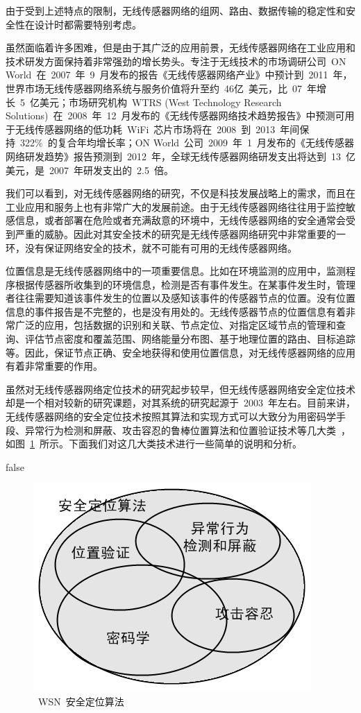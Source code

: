 \documentclass[a4paper,10pt]{article}
\begin{document}
由于受到上述特点的限制，无线传感器网络的组网、路由、数据传输的稳定性和安全性在设计时都需要特别考虑。

虽然面临着许多困难，但是由于其广泛的应用前景，无线传感器网络在工业应用和技术研发方面保持着非常强劲的增长势头。专注于无线技术的市场调研公司~ON World~在~2007~年~9~月发布的报告《无线传感器网络产业》中预计到~2011~年，世界市场无线传感器网络系统与服务价值将升至约~46亿~美元，比~07~年增长~5~亿美元；市场研究机构~WTRS (West Technology
Research Solutions)~在~2008~年~12~月发布的《无线传感器网络技术趋势报告》中预测可用于无线传感器网络的低功耗~WiFi~芯片市场将在~2008~到~2013~年间保持~322\%~的复合年均增长率；ON World~公司~2009~年~1~月发布的《无线传感器网络研发趋势》报告预测到~2012~年，全球无线传感器网络研发支出将达到~13~亿美元，是~2007~年研发支出的~2.5~倍。

我们可以看到，对无线传感器网络的研究，不仅是科技发展战略上的需求，而且在工业应用和服务上也有非常广大的发展前途。由于无线传感器网络往往用于监控敏感信息，或者部署在危险或者充满敌意的环境中，无线传感器网络的安全通常会受到严重的威胁。因此对其安全技术的研究是无线传感器网络研究中非常重要的一环，没有保证网络安全的技术，就不可能有可用的无线传感器网络。

位置信息是无线传感器网络中的一项重要信息。比如在环境监测的应用中，监测程序根据传感器所收集到的环境信息，检测是否有事件发生。在某事件发生时，管理者往往需要知道该事件发生的位置以及感知该事件的传感器节点的位置。没有位置信息的事件报告是不完整的，也是没有用处的。无线传感器节点的位置信息有着非常广泛的应用，包括数据的识别和关联、节点定位、对指定区域节点的管理和查询、评估节点密度和覆盖范围、网络能量分布图、基于地理位置的路由、目标追踪等。因此，保证节点正确、安全地获得和使用位置信息，对无线传感器网络的应用有着非常重要的作用。

虽然对无线传感器网络定位技术的研究起步较早，但无线传感器网络安全定位技术却是一个相对较新的研究课题，对其系统的研究起源于~2003~年左右。目前来讲，无线传感器网络的安全定位技术按照其算法和实现方式可以大致分为用密码学手段、异常行为检测和屏蔽、攻击容忍的鲁棒位置算法和位置验证技术等几大类~\cite{Boukerche2008}，如图~\ref{wsn_sec_pos}~所示。下面我们对这几大类技术进行一些简单的说明和分析。

\if false
\begin{figure}[htbp]
  \centering
  \includegraphics[width=.9\textwidth,keepaspectratio]{wsn_sec_pos}
  \caption{\label{wsn_sec_pos}~WSN~安全定位算法}
\end{figure}
\fi
\end{document}
